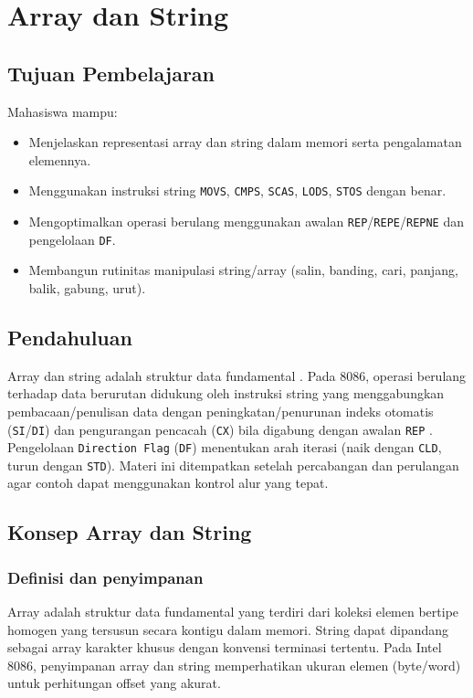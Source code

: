 \documentclass[../main.tex]{subfiles}
\begin{document}
\chapter{Array dan String}

    \section{Tujuan Pembelajaran}
        Mahasiswa mampu:
        \begin{itemize}
            \item Menjelaskan representasi array dan string dalam memori serta pengalamatan elemennya.
            \item Menggunakan instruksi string \texttt{MOVS}, \texttt{CMPS}, \texttt{SCAS}, \texttt{LODS}, \texttt{STOS} dengan benar.
            \item Mengoptimalkan operasi berulang menggunakan awalan \texttt{REP}/\texttt{REPE}/\texttt{REPNE} dan pengelolaan \texttt{DF}.
            \item Membangun rutinitas manipulasi string/array (salin, banding, cari, panjang, balik, gabung, urut).
        \end{itemize}

    \section{Pendahuluan}
        Array dan string adalah struktur data fundamental \cite{assembly_language_programming_guide}. Pada 8086, operasi berulang terhadap data berurutan didukung oleh instruksi string yang menggabungkan pembacaan/penulisan data dengan peningkatan/penurunan indeks otomatis (\texttt{SI}/\texttt{DI}) dan pengurangan pencacah (\texttt{CX}) bila digabung dengan awalan \texttt{REP} \cite{8086_instruction_set_reference}. Pengelolaan \texttt{Direction Flag} (\texttt{DF}) menentukan arah iterasi (naik dengan \texttt{CLD}, turun dengan \texttt{STD}). Materi ini ditempatkan setelah percabangan dan perulangan agar contoh dapat menggunakan kontrol alur yang tepat.

    \section{Konsep Array dan String}
        \subsection{Definisi dan penyimpanan}
            Array adalah struktur data fundamental yang terdiri dari koleksi elemen bertipe homogen yang tersusun secara kontigu dalam memori. String dapat dipandang sebagai array karakter khusus dengan konvensi terminasi tertentu. Pada Intel 8086, penyimpanan array dan string memperhatikan ukuran elemen (byte/word) untuk perhitungan offset yang akurat.
\end{document}
